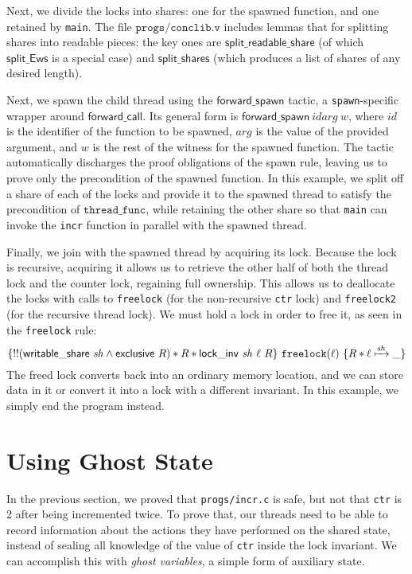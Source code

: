 \documentclass[11pt]{article}
\begin{document}
Next, we divide the locks into shares: one for the spawned function, and one retained by \texttt{main}. The file $\texttt{progs/conclib.v}$ includes lemmas that for splitting shares into readable pieces: the key ones are $\mathsf{split\_readable\_share}$ (of which $\mathsf{split\_Ews}$ is a special case) and $\mathsf{split\_shares}$ (which produces a list of shares of any desired length).

Next, we spawn the child thread using the $\mathsf{forward\_spawn}$ tactic, a \texttt{spawn}-specific wrapper around $\mathsf{forward\_call}$. Its general form is $\mathsf{forward\_spawn}\ \mathit{id} \mathit{arg}\ \mathit{w}$, where $\mathit{id}$ is the identifier of the function to be spawned, $\mathit{arg}$ is the value of the provided argument, and $\mathit{w}$ is the rest of the witness for the spawned function. The tactic automatically discharges the proof obligations of the spawn rule, leaving us to prove only the precondition of the spawned function. In this example, we split off a share of each of the locks and provide it to the spawned thread to satisfy the precondition of $\mathtt{thread\_func}$, while retaining the other share so that \texttt{main} can invoke the \texttt{incr} function in parallel with the spawned thread.

Finally, we join with the spawned thread by acquiring its lock. Because the lock is recursive, acquiring it allows us to retrieve the other half of both the thread lock and the counter lock, regaining full ownership. This allows us to deallocate the locks with calls to \texttt{freelock} (for the non-recursive \texttt{ctr} lock) and \texttt{freelock2} (for the recursive thread lock). We must hold a lock in order to free it, as seen in the \texttt{freelock} rule:
$$\{!!(\mathsf{writable\_share}\ \mathit{sh} \land \mathsf{exclusive}\ R) * R * \mathsf{lock\_inv}\ \mathit{sh}\ \ell\ R\}\ \texttt{freelock}(\ell)\ \{R * \ell \xmapsto{\mathit{sh}} \_\}$$
The freed lock converts back into an ordinary memory location, and we can store data in it or convert it into a lock with a different invariant. In this example, we simply end the program instead.

\section{Using Ghost State}
\label{ghost}
In the previous section, we proved that \texttt{progs/incr.c} is safe, but not that \texttt{ctr} is 2 after being incremented twice. To prove that, our threads need to be able to record information about the actions they have performed on the shared state, instead of sealing all knowledge of the value of \texttt{ctr} inside the lock invariant. We can accomplish this with \emph{ghost variables}, a simple form of auxiliary state.
\end{document}
